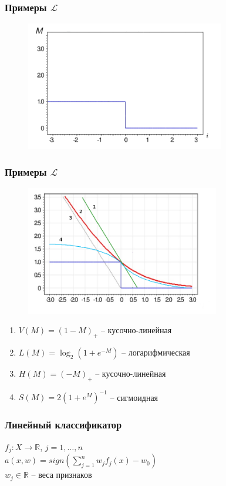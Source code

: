 \documentclass[12pt]{beamer}
\begin{document}
\begin{frame}\frametitle{Примеры $\mathcal{L}$}
\begin{figure}[htbp]
  \includegraphics[height=160pt, keepaspectratio = true]{images/l1}   
\end{figure}
\end{frame}

\begin{frame}\frametitle{Примеры $\mathcal{L}$}
\begin{figure}[htbp]
  \includegraphics[height=160pt, keepaspectratio = true]{images/l}   
\end{figure}
\begin{enumerate}
\item $V(M) = (1-M)_+$ -- кусочно-линейная
\item $L(M) = \log_2(1+e^{-M})$ -- логарифмическая
\item $H(M) = (-M)_+$ -- кусочно-линейная
\item $S(M) = 2(1+e^M)^{-1}$ -- сигмоидная
\end{enumerate}
\end{frame}

\begin{frame}\frametitle{Линейный классификатор}
$f_j: X \rightarrow \mathbb{R}$, $j = 1,\dots, n$\\
\vspace{3mm}
$a(x, w) = sign(\sum\limits_{j=1}^n w_jf_j(x) - w_0)$\\
\vspace{3mm}
$w_j \in \mathbb{R}$ -- веса признаков\\
\end{frame}
\end{document}
